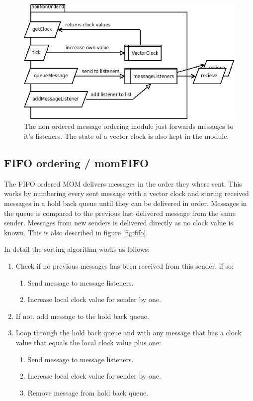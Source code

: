 \documentclass[english]{article}
\begin{document}
\begin{figure}
\includegraphics[width=\textwidth]{momNonOrderd.png}
\caption{The non ordered message ordering module just forwards messages to it's listeners. The state of a vector clock is also kept in the module.}
\label{fig:nonorderd}
\end{figure}

\subsection{FIFO ordering / momFIFO}
\label{mo-fifo}
The FIFO ordered MOM delivers messages in the order they where sent. This works by numbering every sent message with a vector clock and storing received messages in a hold back queue until they can be delivered in order. Messages in the queue is compared to the previous last delivered message from the same sender. Messages from new senders is delivered directly as no clock value is known. This is also described in figure \vref{fig:fifo}.

In detail the sorting algorithm works as follows:
\begin{enumerate}
\item Check if no previous messages has been received from this sender, if so:
	\begin{enumerate}
	\item Send message to message listeners.
	\item Increase local clock value for sender by one.
	\end{enumerate}
\item If not, add message to the hold back queue.
\item Loop through the hold back queue and with any message that has a clock value that equals the local clock value plus one:
	\begin{enumerate}
	\item Send message to message listeners.
	\item Increase local clock value for sender by one.
	\item Remove message from hold back queue.
	\end{enumerate}
\end{enumerate}
\end{document}
